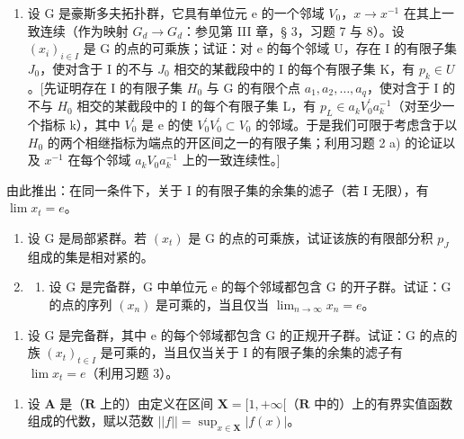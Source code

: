 \begin{enumerate}
\def\labelenumi{\arabic{enumi})}
\setcounter{enumi}{2}
\tightlist
\item
  设 G 是豪斯多夫拓扑群，它具有单位元 e 的一个邻域 \(V_{0}\)，\(x \to x^{-1}\) 在其上一致连续（作为映射 \(G_{d} \to G_{d}\)：参见第 III 章，§ 3，习题 7 与 8）。设 \((x_{i})_{i\in I}\) 是 G 的点的可乘族；试证：对 e 的每个邻域 U，存在 I 的有限子集 \(J_{0}\)，使对含于 I 的不与 \(J_{0}\) 相交的某截段中的 I 的每个有限子集 K，有 \(p_{k}\in U\)。{[}先证明存在 I 的有限子集 \(H_{0}\) 与 G 的有限个点 \(a_{1},a_{2},\ldots,a_{q}\)，使对含于 I 的不与 \(H_{0}\) 相交的某截段中的 I 的每个有限子集 L，有 \(p_{L}\in a_{k}V_{0}^{\prime}a_{k}^{-1}\)（对至少一个指标 k），其中 \(V_{0}^{\prime}\) 是 e 的使 \(V_{0}^{\prime}V_{0}^{\prime}\subset V_{0}\) 的邻域。于是我们可限于考虑含于以 \(H_{0}\) 的两个相继指标为端点的开区间之一的有限子集；利用习题 2 a) 的论证以及 \(x^{-1}\) 在每个邻域 \(a_{k}V_{0}a_{k}^{-1}\) 上的一致连续性。{]}
\end{enumerate}

由此推出：在同一条件下，关于 I 的有限子集的余集的滤子（若 I 无限），有 \(\lim x_{t}=e\)。

\begin{enumerate}
\def\labelenumi{\arabic{enumi})}
\setcounter{enumi}{3}
\item
  设 G 是局部紧群。若 \((x_{t})\) 是 G 的点的可乘族，试证该族的有限部分积 \(p_{J}\) 组成的集是相对紧的。
\item
  \begin{enumerate}
  \def\labelenumii{\alph{enumii})}
  \tightlist
  \item
    设 G 是完备群，G 中单位元 e 的每个邻域都包含 G 的开子群。试证：G 的点的序列 \((x_{n})\) 是可乘的，当且仅当 \(\lim_{n\to\infty}x_{n}=e\)。
  \end{enumerate}
\end{enumerate}

\begin{enumerate}
\def\labelenumi{\alph{enumi})}
\setcounter{enumi}{1}
\tightlist
\item
  设 G 是完备群，其中 e 的每个邻域都包含 G 的正规开子群。试证：G 的点的族 \((x_{t})_{t\in I}\) 是可乘的，当且仅当关于 I 的有限子集的余集的滤子有 \(\lim x_{t}=e\)（利用习题 3）。
\end{enumerate}

\begin{enumerate}
\def\labelenumi{\arabic{enumi})}
\setcounter{enumi}{5}
\tightlist
\item
  设 \(\mathbf{A}\) 是（\(\mathbf{R}\) 上的）由定义在区间 \(\mathbf{X} = [1, +\infty[\)（\(\mathbf{R}\) 中的）上的有界实值函数组成的代数，赋以范数 \(||f|| = \sup_{x\in \mathbf{X}}|f(x)|\)。
\end{enumerate}

